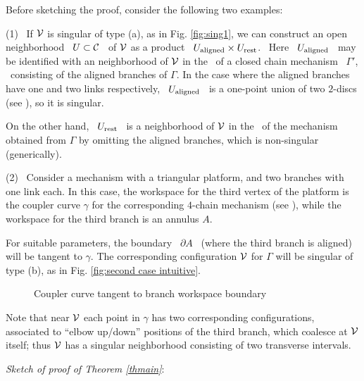 \begin{examples}\label{eks}
%
Before sketching the proof, consider the following two examples\vsm:

\noindent (1) \ If $\mathcal{V}$ is singular of type (a), as in Fig.
\ref{fig:sing1}, we can construct an open neighborhood \ $U\subset
\mathcal{C}$ \ of $\mathcal{V}$ as a product \ $U_{\operatorname{aligned}} \times U_{\operatorname{rest}}$. \
Here \ $U_{\operatorname{aligned}}$ \ may be identified with an neighborhood of
$\mathcal{V}$ in the \cspace\ of a closed chain mechanism \ $\Gamma'$, \
consisting of the aligned branches of $\Gamma$. In the case where
the aligned branches have one and two links respectively,  \
$U_{\operatorname{aligned}}$ \ is a one-point union of two $2$-discs (see
\cite[Proposition 4.1]{SSB2}), so it is singular.

On the other hand, \ $U_{\operatorname{rest}}$ \ is a neighborhood of $\mathcal{V}$ in the
\cspace\ of the mechanism obtained from $\Gamma$ by omitting the
aligned branches, which is non-singular (generically)\vsm.

\noindent (2) \ Consider a mechanism with a triangular platform, and
two branches with one link each. In this case, the workspace
for the third vertex of the platform is the coupler curve $\gamma$ for the
corresponding $4$-chain mechanism (see \cite[Ch.\ 4]{Ha}), while the
workspace for the third branch is an annulus $A$.

For suitable parameters, the boundary \ $\partial A$ \ (where the
third branch is aligned) will be tangent to $\gamma$. The
corresponding configuration $\mathcal{V}$ for $\Gamma$ will be singular of
type (b), as in Fig. \ref{fig:second case intuitive}.

\begin{figure}[htb]
\centering \epsfysize=6cm \leavevmode
{} \caption{Coupler curve
tangent to branch workspace boundary} \label{fig:second case
intuitive}
\end{figure}

Note that near $\mathcal{V}$ each point in $\gamma$ has two
corresponding configurations, associated to ``elbow up/down''
positions of the third branch, which coalesce at $\mathcal{V}$ itself; thus
$\mathcal{V}$ has a singular neighborhood consisting of two transverse
intervals\vsm.
%
\end{examples}


\textit{Sketch of proof of Theorem \ref{thmain}}\vsm:


